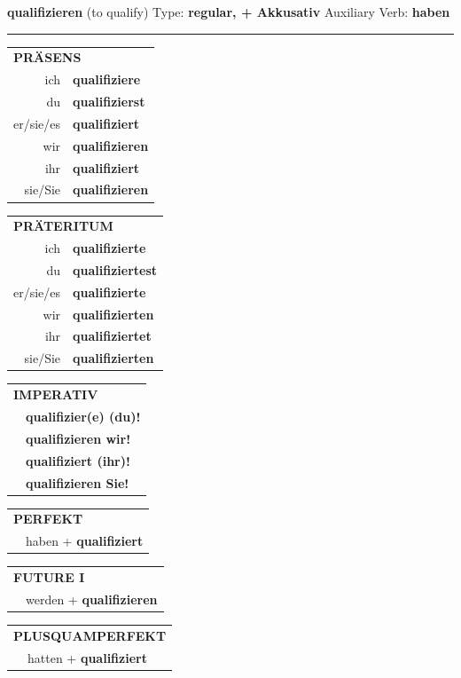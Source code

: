 \documentclass[10pt,a4paper]{revtex4-2}
\begin{document}
\begin{verbbox-acc}
{\Large \bf qualifizieren} (to qualify) \hfill Type: \textbf{regular, + Akkusativ} \hfill Auxiliary Verb: \textbf{haben}

\vspace{5pt}
\hrule
\vspace{5pt}

\begin{tabular}{rl}
\multicolumn{2}{l}{\textbf{PRÄSENS}}\\
ich & \textbf{qualifiziere}\\
du & \textbf{qualifizierst}\\
er/sie/es & \textbf{qualifiziert}\\
wir & \textbf{qualifizieren}\\
ihr & \textbf{qualifiziert}\\
sie/Sie & \textbf{qualifizieren}\\
\end{tabular}
\hfill
\begin{tabular}{rl}
\multicolumn{2}{l}{\textbf{PRÄTERITUM}}\\
ich & \textbf{qualifizierte}\\
du & \textbf{qualifiziertest}\\
er/sie/es & \textbf{qualifizierte}\\
wir & \textbf{qualifizierten}\\
ihr & \textbf{qualifiziertet}\\
sie/Sie & \textbf{qualifizierten}\\
\end{tabular}
\hfill
\begin{tabular}{rl}
\multicolumn{2}{l}{\textbf{IMPERATIV}}\\
& \textbf{qualifizier(e) (du)!}\\
& \textbf{qualifizieren wir!}\\
& \textbf{qualifiziert (ihr)!}\\
& \textbf{qualifizieren Sie!}\\
\end{tabular}

\vspace{10pt}

\begin{tabular}{rl}
\multicolumn{2}{l}{\textbf{PERFEKT}}\\
& haben + \textbf{qualifiziert}\\
\end{tabular}
\hfill
\begin{tabular}{rl}
\multicolumn{2}{l}{\textbf{FUTURE I}}\\
& werden + \textbf{qualifizieren}\\
\end{tabular}
\hfill
\begin{tabular}{rl}
\multicolumn{2}{l}{\textbf{PLUSQUAMPERFEKT}}\\
& hatten + \textbf{qualifiziert}\\
\end{tabular}


\end{verbbox-acc}
\end{document}
